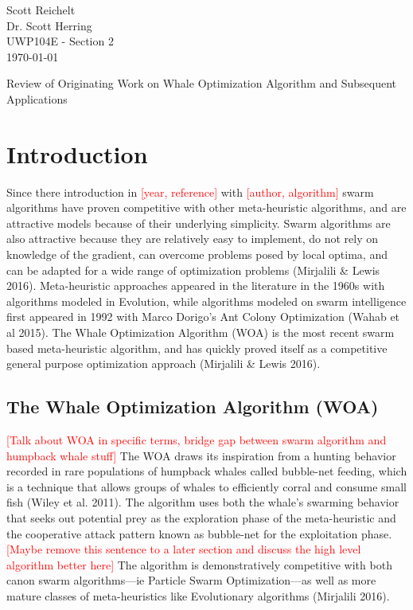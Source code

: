 \documentclass[11pt]{article}
\newcommand{\TODO}[1]{\textcolor{red}{[#1]}}
\begin{document}
    \thispagestyle{empty}
    \begin{flushleft}
        Scott Reichelt\\
        Dr. Scott Herring\\
        UWP104E - Section 2\\
        \today\\
    \end{flushleft}
    \vspace{1em}
    \begin{center}
        Review of Originating Work on Whale Optimization Algorithm and Subsequent Applications
    \end{center}

\section*{Introduction}
Since there introduction in \TODO{year, reference} with \TODO{author, algorithm} swarm algorithms have proven competitive with other meta-heuristic algorithms, and are attractive models because of their underlying simplicity.
Swarm algorithms are also attractive because they are relatively easy to implement, do not rely on knowledge of the gradient, can overcome problems posed by local optima, and can be adapted for a wide range of optimization problems (Mirjalili \& Lewis 2016).
Meta-heuristic approaches appeared in the literature in the 1960s with algorithms modeled in Evolution, while algorithms modeled on swarm intelligence first appeared in 1992 with Marco Dorigo's Ant Colony Optimization (Wahab et al 2015).
The Whale Optimization Algorithm (WOA) is the most recent swarm based meta-heuristic algorithm, and has quickly proved itself as a competitive general purpose optimization approach (Mirjalili \& Lewis 2016).

\subsection*{The Whale Optimization Algorithm (WOA)}
\TODO{Talk about WOA in specific terms, bridge gap between swarm algorithm and humpback whale stuff}
The WOA draws its inspiration from a hunting behavior recorded in rare populations of humpback whales called bubble-net feeding, which is a technique that allows groups of whales to efficiently corral and consume small fish (Wiley et al. 2011).
The algorithm uses both the whale's swarming behavior that seeks out potential prey as the exploration phase of the meta-heuristic and the cooperative attack pattern known as bubble-net for the exploitation phase.
\TODO{Maybe remove this sentence to a later section and discuss the high level algorithm better here}
The algorithm is demonstratively competitive with both canon swarm algorithms---ie Particle Swarm Optimization---as well as more mature classes of meta-heuristics like Evolutionary algorithms (Mirjalili 2016).
\end{document}
